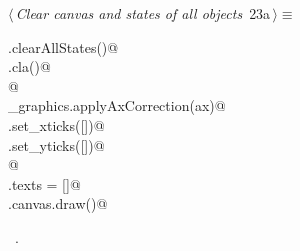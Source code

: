 \documentclass[11.5pt]{report}
\begin{document}
\begin{flushleft} \small\label{scrap16}\raggedright\small
{} $\langle\,${\itshape Clear canvas and states of all objects}\nobreak\ {\footnotesize {23a}}$\,\rangle\equiv$
\vspace{-1ex}
\begin{list}{}{} \item
\mbox{}\verb@run.clearAllStates()@\\
\mbox{}\verb@ax.cla()@\\
\mbox{}\verb@              @\\
\mbox{}\verb@utils_graphics.applyAxCorrection(ax)@\\
\mbox{}\verb@ax.set_xticks([])@\\
\mbox{}\verb@ax.set_yticks([])@\\
\mbox{}\verb@                 @\\
\mbox{}\verb@fig.texts = []@\\
\mbox{}\verb@fig.canvas.draw()@\\
\mbox{}\verb@@{\NWsep}
\end{list}
\vspace{-1.5ex}
\footnotesize
\begin{list}{}{\setlength{\itemsep}{-\parsep}\setlength{\itemindent}{-\leftmargin}}
\item \NWtxtMacroRefIn\ .

\item{}
\end{list}
\vspace{4ex}
\end{flushleft}
\newchunk 
\end{document}
